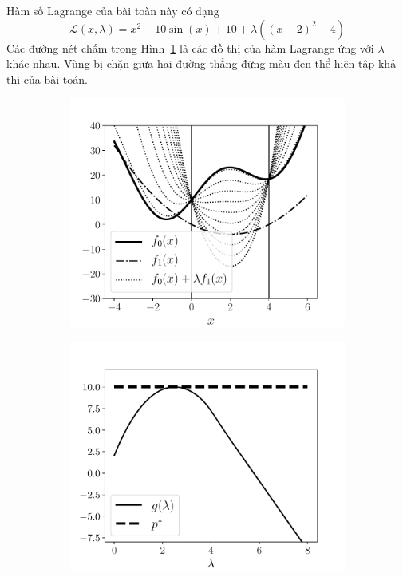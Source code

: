 Hàm số Lagrange của bài toàn này có dạng
\begin{equation*} 
\mathcal{L}(x, \lambda) = x^2 + 10\sin(x) +10+ \lambda((x-2)^2 - 4)  
\end{equation*} 
Các đường nét chấm trong Hình~\ref{fig:18_dualitya} là các đồ thị của hàm Lagrange ứng với
$\lambda$ khác nhau. Vùng bị chặn giữa hai đường thẳng đứng màu đen thể
hiện tập khả thi của bài toán.
\begin{figure}[t]
    \begin{subfigure}{0.48\textwidth}
    \includegraphics[width=0.95\linewidth]{ebookML_src/src/duality/dual_func.pdf}
    \caption{}
    \label{fig:18_dualitya}
    \end{subfigure}
    \begin{subfigure}{0.48\textwidth}
    \includegraphics[width=0.95\linewidth]{ebookML_src/src/duality/dual_func2.pdf}

\end{subfigure}
\end{figure}

